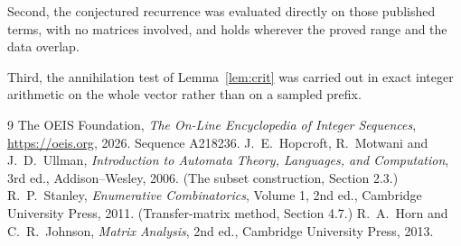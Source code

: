 \documentclass[11pt,a4paper]{article}
\theoremstyle{plain}
\theoremstyle{definition}
\begin{document}
Second, the conjectured recurrence was evaluated directly on those published terms, with no
matrices involved, and holds wherever the proved range and the data overlap.

Third, the annihilation test of Lemma~\ref{lem:crit} was carried out in exact integer
arithmetic on the whole vector rather than on a sampled prefix.

\begin{thebibliography}{9}
 The OEIS Foundation, \emph{The On-Line Encyclopedia of Integer
Sequences}, \url{https://oeis.org}, 2026. Sequence A218236.
 J.~E.~Hopcroft, R.~Motwani and J.~D.~Ullman, \emph{Introduction to Automata
Theory, Languages, and Computation}, 3rd ed., Addison--Wesley, 2006. (The subset
construction, Section 2.3.)
 R.~P.~Stanley, \emph{Enumerative Combinatorics}, Volume 1, 2nd ed.,
Cambridge University Press, 2011. (Transfer-matrix method, Section 4.7.)
 R.~A.~Horn and C.~R.~Johnson, \emph{Matrix Analysis}, 2nd ed., Cambridge
University Press, 2013.
\end{thebibliography}
\end{document}
